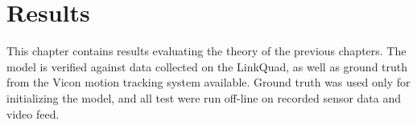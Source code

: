 \chapter{Results}
\label{cha:results}
    This chapter contains results evaluating the theory of the previous chapters.
    The model is verified against data collected on the LinkQuad, as well
    as ground truth from the Vicon motion tracking system available.
    Ground truth was used only for initializing the model, and all test
    were run off-line on recorded sensor data and video feed.

    
    
    
    
